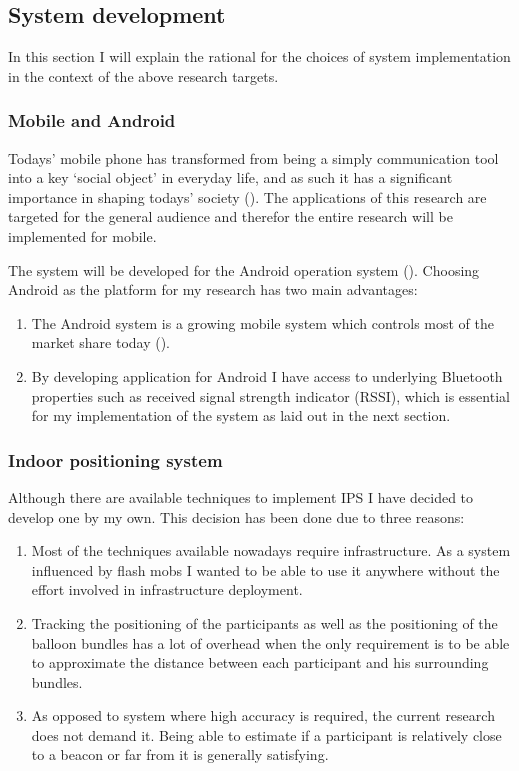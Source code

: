 \documentclass[a4paper,11pt]{article}
\begin{document}
\subsection{System development}

In this section I will explain the rational for the choices of system implementation in the context of the above research targets.

\subsubsection{Mobile and Android}

Todays' mobile phone has transformed from being a simply communication tool into a key `social object' in everyday life, and as such it has a significant importance in shaping todays' society (\cite{srivastava05}).
The applications of this research are targeted for the general audience and therefor the entire research will be implemented for mobile.

The system will be developed for the Android operation system (\citeauthor{web:android}).
Choosing Android as the platform for my research has two main advantages:
\begin{enumerate}
	\item The Android system is a growing mobile system which controls most of the market share today (\cite{web:idc}).
	\item By developing application for Android I have access to underlying Bluetooth properties such as received signal strength indicator (RSSI), which is essential for my implementation of the system as laid out in the next section.
\end{enumerate}

\subsubsection{Indoor positioning system}\label{methods:ips}

Although there are available techniques to implement IPS I have decided to develop one by my own.
This decision has been done due to three reasons:
\begin{enumerate}
	\item Most of the techniques available nowadays require infrastructure.
	As a system influenced by flash mobs I wanted to be able to use it anywhere without the effort involved in infrastructure deployment.
	\item Tracking the positioning of the participants as well as the positioning of the balloon bundles has a lot of overhead when the only requirement is to be able to approximate the distance between each participant and his surrounding bundles.
	\item As opposed to system where high accuracy is required, the current research does not demand it.
	Being able to estimate if a participant is relatively close to a beacon or far from it is generally satisfying.
\end{enumerate}
\end{document}
